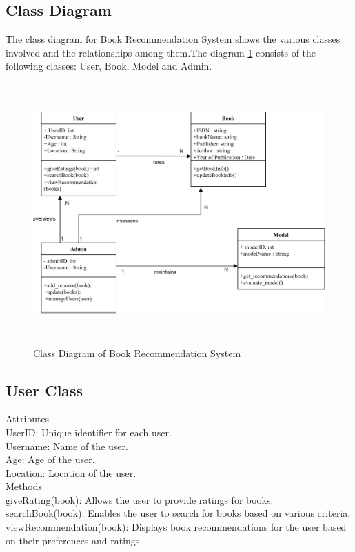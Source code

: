\subsection{Class Diagram}
The class diagram for Book Recommendation System shows the various classes involved and the relationships among them.The diagram \ref{class-diagram} consists of the  following classes: User, Book, Model and Admin.
\begin{figure}[h]
    \centering
    \includegraphics[width=1\linewidth, height=10cm]{img/Graphics/classDiagram_BRS.png}
    \caption{Class Diagram of Book Recommendation System}
    \label{class-diagram}
\end{figure}
\subsection*{User Class}
Attributes\\
UserID: Unique identifier for each user.\\
Username: Name of the user.\\
Age: Age of the user.\\
Location: Location of the user.\\
Methods\\
giveRating(book): Allows the user to provide ratings for books.\\
searchBook(book): Enables the user to search for books based on various criteria.\\
viewRecommendation(book): Displays book recommendations for the user based on their preferences and ratings.\\


